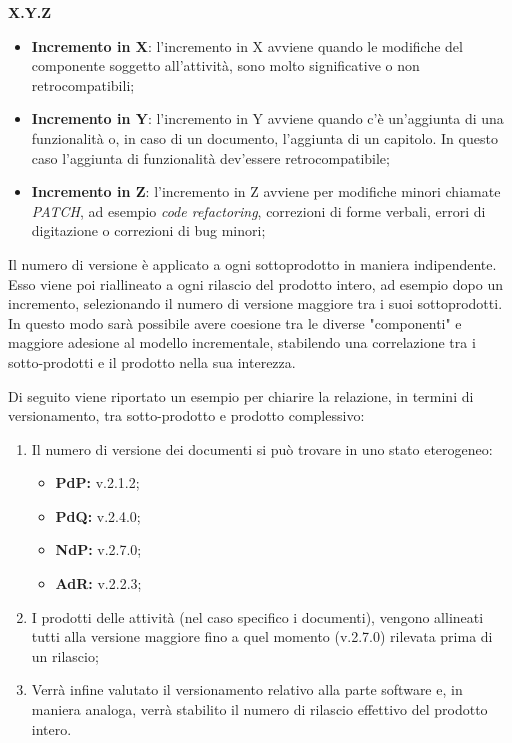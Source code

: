 \centerline{\textbf{X.Y.Z}}

\begin{itemize}
  \item \textbf{Incremento in X}: l'incremento in X avviene quando le modifiche del componente soggetto all'attività, sono molto significative o non retrocompatibili;
  \item \textbf{Incremento in Y}: l'incremento in Y avviene quando c'è un'aggiunta di una funzionalità o, in caso di un documento, l'aggiunta di un capitolo.
	In questo caso l'aggiunta di funzionalità dev'essere retrocompatibile;
  \item \textbf{Incremento in Z}: l'incremento in Z avviene per modifiche minori chiamate \textit{PATCH\glo}, ad esempio \textit{code refactoring\glos},
	correzioni di forme verbali, errori di digitazione o correzioni di bug minori;

\end{itemize}
 \noindent Il numero di versione è applicato a ogni sottoprodotto in maniera indipendente.
 Esso viene poi riallineato a ogni rilascio del prodotto intero, ad esempio dopo un incremento, selezionando il numero di versione maggiore tra i suoi sottoprodotti.
 In questo modo sarà possibile avere coesione tra le diverse "componenti" e maggiore adesione al modello incrementale, stabilendo una correlazione tra i sotto-prodotti e il prodotto nella sua interezza.
 

\noindent Di seguito viene riportato un esempio per chiarire la relazione, in termini di versionamento, tra sotto-prodotto e prodotto complessivo:
\begin{enumerate}
	\item Il numero di versione dei documenti si può trovare in uno stato eterogeneo:
	\begin{itemize}
		\item \textbf{PdP:} v.2.1.2;
		\item \textbf{PdQ:} v.2.4.0;
		\item \textbf{NdP:} v.2.7.0;
		\item\textbf{AdR:} v.2.2.3;
	\end{itemize}
	\item I prodotti delle attività (nel caso specifico i documenti), vengono allineati tutti alla versione maggiore fino a quel momento (v.2.7.0) rilevata prima di un rilascio;
	\item Verrà infine valutato il versionamento relativo alla parte software e, in maniera analoga, verrà stabilito il numero di rilascio effettivo del prodotto intero. 
\end{enumerate}





